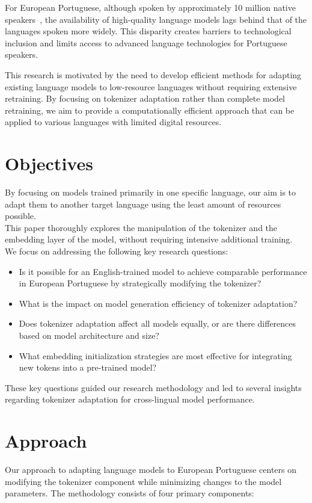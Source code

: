 For European Portuguese, although spoken by approximately 10 million native speakers~\cite{EuropeanPortuguese_wikipedia}, the availability of high-quality language models lags behind that of the languages spoken more widely. This disparity creates barriers to technological inclusion and limits access to advanced language technologies for Portuguese speakers.

This research is motivated by the need to develop efficient methods for adapting existing language models to low-resource languages without requiring extensive retraining. By focusing on tokenizer adaptation rather than complete model retraining, we aim to provide a computationally efficient approach that can be applied to various languages with limited digital resources.

\section{Objectives}\label{Section1.2}
By focusing on models trained primarily in one specific language, our aim is to adapt them to another target language using the least amount of resources possible.\\
This paper thoroughly explores the manipulation of the tokenizer  and the embedding layer of the model, without requiring intensive additional training.\\

We focus on addressing the following key research questions:
\begin{itemize}
    \item Is it possible for an English-trained model to achieve comparable performance in European Portuguese by strategically modifying the tokenizer?
    \item What is the impact on model generation efficiency of tokenizer adaptation?
    \item Does tokenizer adaptation affect all models equally, or are there differences based on model architecture and size?
    \item What embedding initialization strategies are most effective for integrating new tokens into a pre-trained model?
\end{itemize}
These key questions guided our research methodology and led to several insights regarding tokenizer adaptation for cross-lingual model performance.

\section{Approach}\label{Section1.3}
Our approach to adapting language models to European Portuguese centers on modifying the tokenizer component while minimizing changes to the model parameters. The methodology consists of four primary components:

